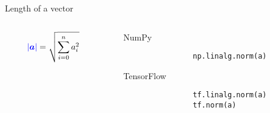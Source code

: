 \documentclass[handout]{beamer}
\begin{document}
\begin{frame}[fragile]{Length of a vector}
    \begin{columns}
        \begin{column}{0.5\textwidth}
        \huge
            \begin{align*}
                \textcolor{blue}{|\boldsymbol{a}|} &= \sqrt{\sum^{n}_{i=0} a_i^2}
            \end{align*}
        \end{column}
        \begin{column}{0.5\textwidth}
            \begin{alertblock}{NumPy}
                \begin{lstlisting}
                np.linalg.norm(a)
                \end{lstlisting}
            \end{alertblock}
            \begin{alertblock}{TensorFlow}
                \begin{lstlisting}
                tf.linalg.norm(a)
                tf.norm(a)
                \end{lstlisting}
            \end{alertblock}
        \end{column}
    \end{columns}
\end{frame}
\end{document}
